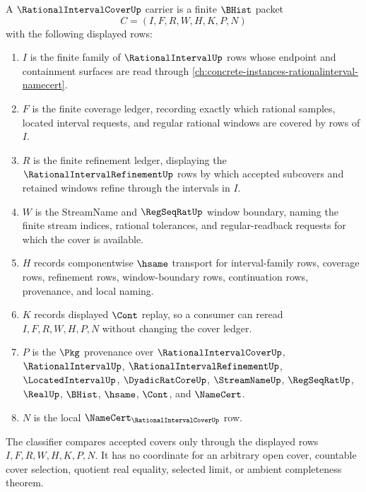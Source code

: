 \begin{definition}
\label{def:rational-interval-cover-carrier}
A $\RationalIntervalCoverUp$ carrier is a finite $\BHist$ packet
$$
C=(I,F,R,W,H,K,P,N)
$$
with the following displayed rows:
\begin{enumerate}
\item $I$ is the finite family of $\RationalIntervalUp$ rows whose endpoint and containment surfaces are read through \autoref{ch:concrete-instances-rationalinterval-namecert}.
\item $F$ is the finite coverage ledger, recording exactly which rational samples, located interval requests, and regular rational windows are covered by rows of $I$.
\item $R$ is the finite refinement ledger, displaying the $\RationalIntervalRefinementUp$ rows by which accepted subcovers and retained windows refine through the intervals in $I$.
\item $W$ is the StreamName and $\RegSeqRatUp$ window boundary, naming the finite stream indices, rational tolerances, and regular-readback requests for which the cover is available.
\item $H$ records componentwise $\hsame$ transport for interval-family rows, coverage rows, refinement rows, window-boundary rows, continuation rows, provenance, and local naming.
\item $K$ records displayed $\Cont$ replay, so a consumer can reread $I,F,R,W,H,P,N$ without changing the cover ledger.
\item $P$ is the $\Pkg$ provenance over $\RationalIntervalCoverUp$, $\RationalIntervalUp$, $\RationalIntervalRefinementUp$, $\LocatedIntervalUp$, $\DyadicRatCoreUp$, $\StreamNameUp$, $\RegSeqRatUp$, $\RealUp$, $\BHist$, $\hsame$, $\Cont$, and $\NameCert$.
\item $N$ is the local $\NameCert_{\RationalIntervalCoverUp}$ row.
\end{enumerate}
The classifier compares accepted covers only through the displayed rows $I,F,R,W,H,K,P,N$. It has no coordinate for an arbitrary open cover, countable cover selection, quotient real equality, selected limit, or ambient completeness theorem.
\end{definition}

